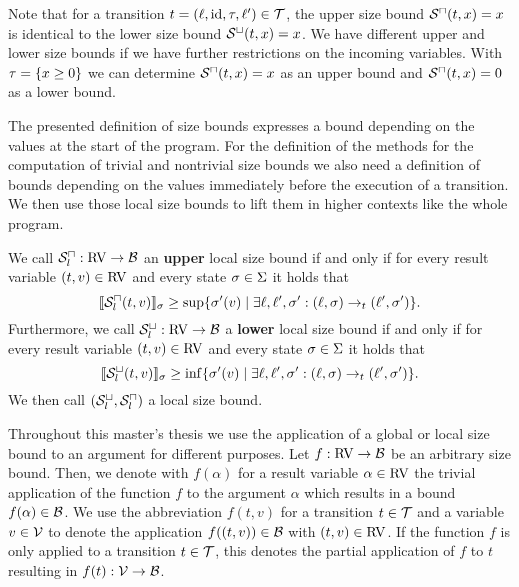 Note that for a transition $t = (\ell,\text{id},\tau,\ell') \in \mathcal{T}$, the upper size bound ${\mathcal{S}^\sqcap}(t,x) = x$ is identical to the lower size bound ${\mathcal{S}^\sqcup}(t,x) = x$.
We have different upper and lower size bounds if we have further restrictions on the incoming variables.
With $\tau = \lbrace x \geq 0 \rbrace$ we can determine ${\mathcal{S}^\sqcap}(t,x) = x$ as an upper bound and ${\mathcal{S}^\sqcap}(t,x) = 0$ as a lower bound.

The presented definition of size bounds expresses a bound depending on the values at the start of the program.
For the definition of the methods for the computation of trivial and nontrivial size bounds we also need a definition of bounds depending on the values immediately before the execution of a transition.
We then use those local size bounds to lift them in higher contexts like the whole program.

\begin{definition}
  We call ${\mathcal{S}^\sqcap_l}: \text{RV} \rightarrow \mathcal{B}$ an \textbf{upper} local size bound if and only if for every result variable $(t, v) \in \text{RV}$ and every state $\sigma \in \Sigma$ it holds that
  \[ \llbracket {\mathcal{S}^\sqcap_l}(t, v) \rrbracket_{\sigma} \geq \sup \lbrace \sigma'(v) \mid \exists \ell, \ell', \sigma': (\ell, \sigma) \rightarrow_t (\ell', \sigma') \rbrace. \]
  Furthermore, we call ${\mathcal{S}^\sqcup_l}: \text{RV} \rightarrow \mathcal{B}$ a \textbf{lower} local size bound if and only if for every result variable $(t, v) \in \text{RV}$ and every state $\sigma \in \Sigma$ it holds that
  \[ \llbracket {\mathcal{S}^\sqcup_l}(t, v) \rrbracket_{\sigma} \geq \inf \lbrace \sigma'(v) \mid \exists \ell, \ell', \sigma': (\ell, \sigma) \rightarrow_t (\ell', \sigma') \rbrace. \]
  We then call ${({\mathcal{S}^\sqcup_l}, {\mathcal{S}^\sqcap_l})}$ a local size bound.
\end{definition}


Throughout this master's thesis we use the application of a global or local size bound to an argument for different purposes.
Let $f: \text{RV} \rightarrow \mathcal{B}$ be an arbitrary size bound.
Then, we denote with $f(\alpha)$ for a result variable $\alpha \in \text{RV}$ the trivial application of the function $f$ to the argument $\alpha$ which results in a bound $f(\alpha) \in \mathcal{B}$.
We use the abbreviation $f(t, v)$ for a transition $t \in \mathcal{T}$ and a variable $v \in \mathcal{V}$ to denote the application $f((t,v)) \in \mathcal{B}$ with $(t,v) \in \text{RV}$.
If the function $f$ is only applied to a transition $t \in \mathcal{T}$, this denotes the partial application of $f$ to $t$ resulting in $f(t): \mathcal{V} \rightarrow \mathcal{B}$.

